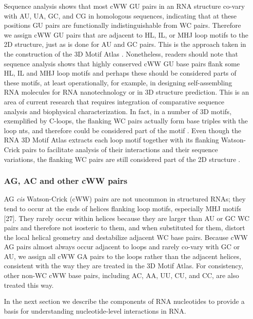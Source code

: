 Sequence analysis shows that most cWW GU pairs in an RNA structure co-vary with
AU, UA, GC, and CG in homologous sequences, indicating that at these positions
GU pairs are functionally indistinguishable from WC pairs. Therefore we assign
cWW GU pairs that are adjacent to HL, IL, or MHJ loop motifs to the 2D
structure, just as is done for AU and GC pairs. This is the approach taken in
the construction of the 3D Motif Atlas \cite{Petrov2013}. Nonetheless, readers
should note that sequence analysis shows that highly conserved cWW GU base pairs
flank some HL, IL and MHJ loop motifs and perhaps these should be considered
parts of these motifs, at least operationally, for example, in designing
self-assembling RNA molecules for RNA nanotechnology or in 3D structure
prediction. This is an area of current research that requires integration of
comparative sequence analysis and biophysical characterization. In fact, in a
number of 3D motifs, exemplified by C-loops, the flanking WC pairs actually form
base triples with the loop nts, and therefore could be considered part of the
motif \cite{Lescoute2005}. Even though the RNA 3D Motif Atlas extracts each loop
motif together with its flanking Watson-Crick pairs to facilitate analysis of
their interactions and their sequence variations, the flanking WC pairs are
still considered part of the 2D structure \cite{Petrov2013}. 

\subsubsection{AG, AC and other cWW pairs}

AG \emph{cis} Watson-Crick (cWW) pairs are not uncommon in structured RNAs; they
tend to occur at the ends of helices flanking loop motifs, especially MHJ motifs
[27]. They rarely occur within helices because they are larger than AU or GC WC
pairs and therefore not isosteric to them, and when substituted for them,
distort the local helical geometry and destabilize adjacent WC base pairs.
Because cWW AG pairs almost always occur adjacent to loops and rarely co-vary
with GC or AU, we assign all cWW GA pairs to the loops rather than the adjacent
helices, consistent with the way they are treated in the 3D Motif Atlas. For
consistency, other non-WC cWW base pairs, including AC, AA, UU, CU, and CC, are
also treated this way.

In the next section we describe the components of RNA nucleotides to provide a
basis for understanding nucleotide-level interactions in RNA. 

